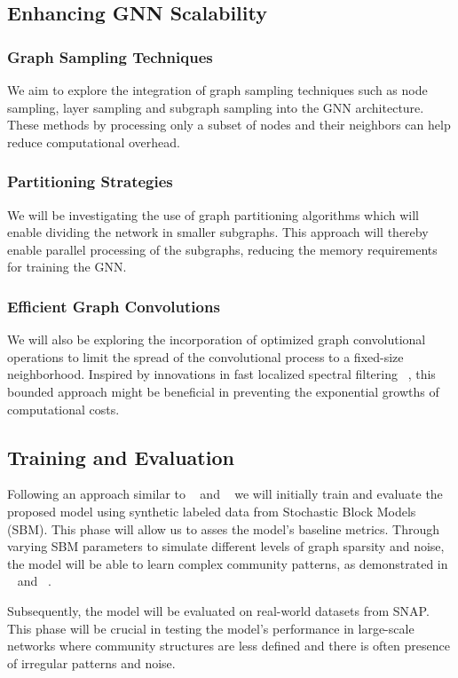 \documentclass{article}
\begin{document}
\subsection{Enhancing GNN Scalability}
\subsubsection{Graph Sampling Techniques}
We aim to explore the integration of graph sampling techniques such as node sampling, layer sampling and subgraph sampling into the GNN architecture. These methods by processing only a subset of nodes and their neighbors can help reduce computational overhead.
\subsubsection{Partitioning Strategies}
We will be investigating the use of graph partitioning algorithms which will enable dividing the network in smaller subgraphs. This approach will thereby enable parallel processing of the subgraphs, reducing the memory requirements for training the GNN.
\subsubsection{Efficient Graph Convolutions}
We will also be exploring the incorporation of optimized graph convolutional operations to limit the spread of the convolutional process to a fixed-size neighborhood. Inspired by innovations in fast localized spectral filtering ~\cite{defferrard2016convolutional}, this bounded approach might be beneficial in preventing the exponential growths of computational costs.

\subsection{Training and Evaluation}
Following an approach similar to ~\cite{yuan2022community} and ~\cite{chen2017supervised} we will initially train and evaluate the proposed model using synthetic labeled data from Stochastic Block Models (SBM). This phase will allow us to asses the model's baseline metrics. Through varying SBM parameters to simulate different levels of graph sparsity and noise, the model will be able to learn complex community patterns, as demonstrated in ~\cite{yuan2022community} and ~\cite{chen2017supervised}. 

Subsequently, the model will be evaluated on real-world datasets from SNAP. This phase will be crucial in testing the model's performance in large-scale networks where community structures are less defined and there is often presence of irregular patterns and noise.
\end{document}
